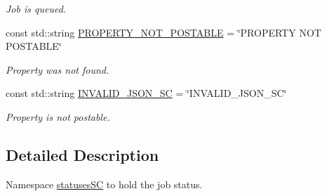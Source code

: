 \begin{DoxyCompactItemize}
\begin{DoxyCompactList}\small\item\em Job is queued. \end{DoxyCompactList}\item 
const std\+::string \hyperlink{namespacestatusesSC_a62370adf1bc1e046de8d08fe0d72f202}{P\+R\+O\+P\+E\+R\+T\+Y\+\_\+\+N\+O\+T\+\_\+\+P\+O\+S\+T\+A\+B\+LE} = \char`\"{}P\+R\+O\+P\+E\+R\+TY N\+OT P\+O\+S\+T\+A\+B\+LE\char`\"{}\hypertarget{namespacestatusesSC_a62370adf1bc1e046de8d08fe0d72f202}{}\label{namespacestatusesSC_a62370adf1bc1e046de8d08fe0d72f202}

\begin{DoxyCompactList}\small\item\em Property was not found. \end{DoxyCompactList}\item 
const std\+::string \hyperlink{namespacestatusesSC_a5dd57babee0dc086419538e07845f3f9}{I\+N\+V\+A\+L\+I\+D\+\_\+\+J\+S\+O\+N\+\_\+\+SC} = \char`\"{}I\+N\+V\+A\+L\+I\+D\+\_\+\+J\+S\+O\+N\+\_\+\+SC\char`\"{}\hypertarget{namespacestatusesSC_a5dd57babee0dc086419538e07845f3f9}{}\label{namespacestatusesSC_a5dd57babee0dc086419538e07845f3f9}

\begin{DoxyCompactList}\small\item\em Property is not postable. \end{DoxyCompactList}\end{DoxyCompactItemize}


\subsection{Detailed Description}
Namespace \hyperlink{namespacestatusesSC}{statuses\+SC} to hold the job status. 